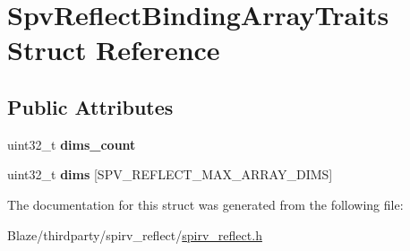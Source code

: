 \hypertarget{structSpvReflectBindingArrayTraits}{}\section{Spv\+Reflect\+Binding\+Array\+Traits Struct Reference}
\label{structSpvReflectBindingArrayTraits}
\subsection*{Public Attributes}
\begin{DoxyCompactItemize}
\item 
\mbox{\label{structSpvReflectBindingArrayTraits_a56a492eb77fabe60a06c15174749be5c}} 
uint32\+\_\+t {\bfseries dims\+\_\+count}
\item 
\mbox{\label{structSpvReflectBindingArrayTraits_ab0dd6af8d423ae2c1d4eaeff5b2c157e}} 
uint32\+\_\+t {\bfseries dims} \mbox{[}S\+P\+V\+\_\+\+R\+E\+F\+L\+E\+C\+T\+\_\+\+M\+A\+X\+\_\+\+A\+R\+R\+A\+Y\+\_\+\+D\+I\+MS\mbox{]}
\end{DoxyCompactItemize}


The documentation for this struct was generated from the following file\+:\begin{DoxyCompactItemize}
\item 
Blaze/thirdparty/spirv\+\_\+reflect/\hyperlink{spirv__reflect_8h}{spirv\+\_\+reflect.\+h}\end{DoxyCompactItemize}

